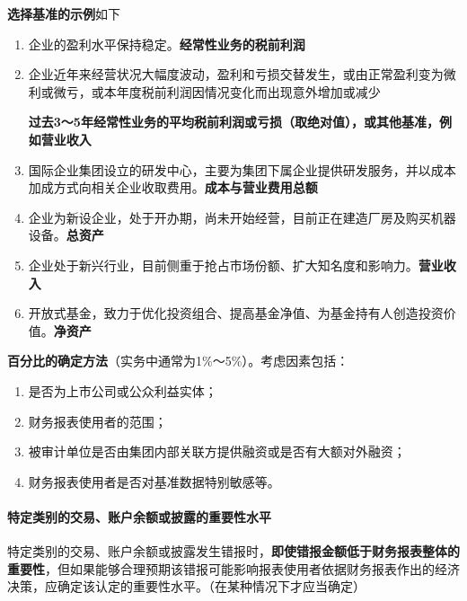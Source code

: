 \documentclass[UTF8,12pt]{ctexart}
\numberwithin{equation}{section} %
\numberwithin{figure}{section}
\numberwithin{table}{section}
\begin{document}
	\textbf{选择基准的示例}如下
	\begin{enumerate}
		\item 企业的盈利水平保持稳定。\textbf{经常性业务的税前利润}
		
		\item 企业近年来经营状况大幅度波动，盈利和亏损交替发生，或由正常盈利变为微利或微亏，或本年度税前利润因情况变化而出现意外增加或减少
		
		\textbf{过去3～5年经常性业务的平均税前利润或亏损（取绝对值），或其他基准，例如营业收入}
		
		\item 国际企业集团设立的研发中心，主要为集团下属企业提供研发服务，并以成本加成方式向相关企业收取费用。\textbf{成本与营业费用总额}
		
		\item 企业为新设企业，处于开办期，尚未开始经营，目前正在建造厂房及购买机器设备。\textbf{总资产}
		
		\item 企业处于新兴行业，目前侧重于抢占市场份额、扩大知名度和影响力。\textbf{营业收入}
		
		\item 开放式基金，致力于优化投资组合、提高基金净值、为基金持有人创造投资价值。\textbf{净资产}
		
	\end{enumerate}
	
	
	\textbf{百分比的确定方法}（实务中通常为1\%～5\%）。考虑因素包括：
	\begin{enumerate}
		\item 是否为上市公司或公众利益实体；
		
		\item 财务报表使用者的范围；
		
		\item 被审计单位是否由集团内部关联方提供融资或是否有大额对外融资；
		
		\item 财务报表使用者是否对基准数据特别敏感等。
		
	\end{enumerate}
	
	\paragraph{特定类别的交易、账户余额或披露的重要性水平}
	特定类别的交易、账户余额或披露发生错报时，\textbf{即使错报金额低于财务报表整体的重要性}，但如果能够合理预期该错报可能影响报表使用者依据财务报表作出的经济决策，应确定该认定的重要性水平。（在某种情况下才应当确定）
	
\end{document}

